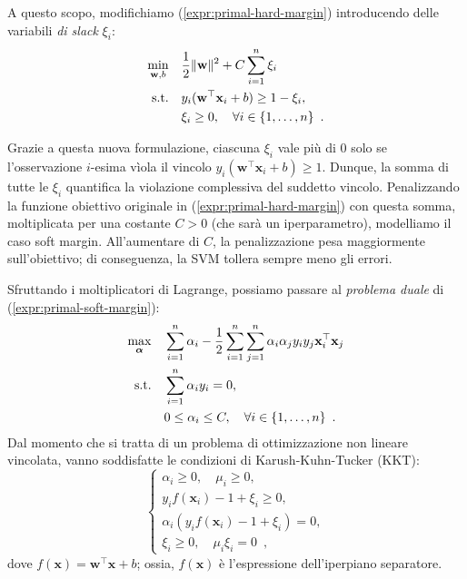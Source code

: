 A questo scopo, modifichiamo (\ref{expr:primal-hard-margin}) introducendo delle variabili \textit{di slack} $\xi_i$:
\begin{equation}
    \begin{aligned}
    \min_{\mathbf{w},b} \quad & \frac{1}{2}\|\mathbf{w}\|^2 + C \sum_{i=1}^n \xi_i \\
    \text{s.t.} \quad & y_i(\mathbf{w}^{\top} \mathbf{x}_i +b) \geq 1 - \xi_i, \\
    & \xi_i \geq 0, \quad \forall \space i \in \{1, \dots, n\} \enspace .
    \end{aligned}
    \label{expr:primal-soft-margin}
\end{equation}

Grazie a questa nuova formulazione, ciascuna $\xi_i$ vale più di 0 solo se l'osservazione $i$-esima vìola il vincolo $y_i(\mathbf{w}^{\top} \mathbf{x}_i +b) \geq 1$. Dunque, la somma di tutte le $\xi_i$ quantifica la violazione complessiva del suddetto vincolo. Penalizzando la funzione obiettivo originale in (\ref{expr:primal-hard-margin}) con questa somma, moltiplicata per una costante $C>0$ (che sarà un iperparametro), modelliamo il caso soft margin. All'aumentare di $C$, la penalizzazione pesa maggiormente sull'obiettivo; di conseguenza, la SVM tollera sempre meno gli errori.

Sfruttando i moltiplicatori di Lagrange, possiamo passare al \textit{problema duale} di (\ref{expr:primal-soft-margin}):
\begin{equation}
    \begin{aligned}
    \max_{\boldsymbol{\alpha}} \quad & \sum_{i=1}^{n} \alpha_i - \frac{1}{2} \sum_{i=1}^{n} \sum_{j=1}^{n} \alpha_i \alpha_j y_i y_j \mathbf{x}_i^{\top} \mathbf{x}_j \\
    \text{s.t.} \quad & \sum_{i=1}^{n} \alpha_i y_i = 0, \\
    & 0 \leq \alpha_i \leq C, \quad \forall \space i \in \{1, \dots, n\} \enspace .
    \end{aligned}
\end{equation}
Dal momento che si tratta di un problema di ottimizzazione non lineare vincolata, vanno soddisfatte le condizioni di Karush-Kuhn-Tucker (KKT):
\begin{equation}
        \begin{cases}
            \alpha_i \geq 0, \quad \mu_i \geq 0, \\
            y_i f(\mathbf{x}_i)-1 + \xi_i \geq 0, \\
            \alpha_i (y_i f(\mathbf{x}_i)-1 + \xi_i) = 0, \\
            \xi_i \geq 0, \quad \mu_i \xi_i = 0 \enspace ,
        \end{cases}
\end{equation}
dove $f(\mathbf{x}) = \mathbf{w}^{\top} \mathbf{x} +b$; ossia, $f(\mathbf{x})$ è l'espressione dell'iperpiano separatore.

